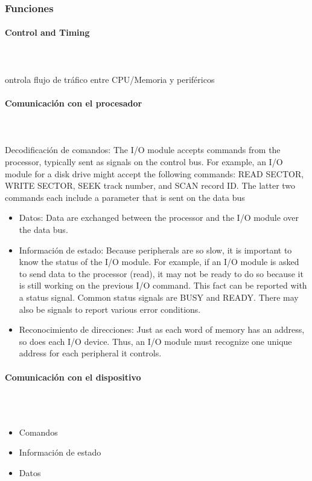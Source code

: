 \subsubsection{Funciones}
\paragraph{Control and Timing}\mbox{}\\\\%
ontrola flujo de tráfico entre CPU/Memoria y periféricos
\paragraph{Comunicación con el procesador}\mbox{}\\\\%
Decodificación de comandos: The I/O module accepts commands from the processor, typically sent as signals on the control bus. For example, an I/O module for a disk drive might accept the following commands: READ SECTOR, WRITE SECTOR, SEEK track number, and SCAN record ID. The latter two commands each include a parameter that is sent on the data bus
\begin{itemize}
	\item Datos: Data are exchanged between the processor and the I/O module over the data bus.
	\item Información de estado: Because peripherals are so slow, it is important to know the	status of the I/O module. For example, if an I/O module is asked to send data to the processor (read), it may not be ready to do so because it is still working on the previous I/O command. This fact can be reported with a status signal.	Common status signals are BUSY and READY. There may also be signals to report various error conditions.
	\item Reconocimiento de direcciones: Just as each word of memory has an address, so does each I/O device. Thus, an I/O module must recognize one unique address for each peripheral it controls.
\end{itemize}
\paragraph{Comunicación con el dispositivo}\mbox{}\\\\%
\begin{itemize}
\item Comandos
\item Información de estado
\item Datos
\end{itemize}
